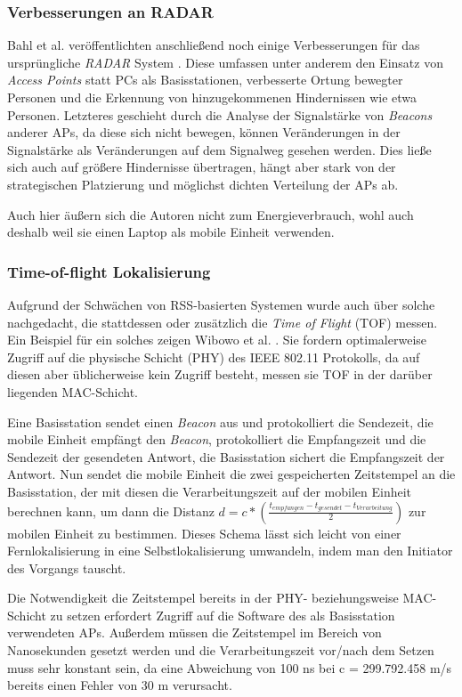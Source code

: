 \subsubsection{Verbesserungen an RADAR}
Bahl et al. veröffentlichten anschließend noch einige Verbesserungen für das ursprüngliche \emph{RADAR} System \cite{bahl2000enhancements}.
Diese umfassen unter anderem den Einsatz von \emph{Access Points} statt PCs als Basisstationen, verbesserte Ortung bewegter Personen und die Erkennung von hinzugekommenen Hindernissen wie etwa Personen.
Letzteres geschieht durch die Analyse der Signalstärke von \emph{Beacons} anderer APs, da diese sich nicht bewegen, können Veränderungen in der Signalstärke als Veränderungen auf dem Signalweg gesehen werden.
Dies ließe sich auch auf größere Hindernisse übertragen, hängt aber stark von der strategischen Platzierung und möglichst dichten Verteilung der APs ab.

Auch hier äußern sich die Autoren nicht zum Energieverbrauch, wohl auch deshalb weil sie einen Laptop als mobile Einheit verwenden.

\subsubsection{Time-of-flight Lokalisierung}
\label{ch:Vorherige:sec:TOF}
Aufgrund der Schwächen von RSS-basierten Systemen wurde auch über solche nachgedacht, die stattdessen oder zusätzlich die \emph{Time of Flight} (TOF) messen. 
Ein Beispiel für ein solches zeigen Wibowo et al. \cite{wibowo2009time}. 
Sie fordern optimalerweise Zugriff auf die physische Schicht (PHY) des IEEE 802.11 Protokolls, da auf diesen aber üblicherweise kein Zugriff besteht, messen sie TOF in der darüber liegenden MAC-Schicht.

Eine Basisstation sendet einen \emph{Beacon} aus und protokolliert die Sendezeit, die mobile Einheit empfängt den \emph{Beacon}, protokolliert die Empfangszeit und die Sendezeit der gesendeten Antwort, die Basisstation sichert die Empfangszeit der Antwort.
Nun sendet die mobile Einheit die zwei gespeicherten Zeitstempel an die Basisstation, der mit diesen die Verarbeitungszeit auf der mobilen Einheit berechnen kann, um dann die Distanz $d = c * (\frac{t_{empfangen} - t_{gesendet} - t_{Verarbeitung}}{2})$ zur mobilen Einheit zu bestimmen.
Dieses Schema lässt sich leicht von einer Fernlokalisierung in eine Selbstlokalisierung umwandeln, indem man den Initiator des Vorgangs tauscht.

Die Notwendigkeit die Zeitstempel bereits in der PHY- beziehungsweise MAC-Schicht zu setzen erfordert Zugriff auf die Software des als Basisstation verwendeten APs. 
Außerdem müssen die Zeitstempel im Bereich von Nanosekunden gesetzt werden und die Verarbeitungszeit vor/nach dem Setzen muss sehr konstant sein, da eine Abweichung von 100 ns bei c = 299.792.458 m/s bereits einen Fehler von 30 m verursacht.

